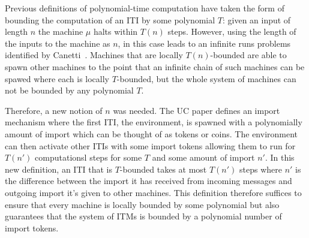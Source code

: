 Previous definitions of polynomial-time computation have taken the form of bounding the computation of an ITI by some polynomial $T$:
given an input of length $n$ the machine $\mu$ halts within $T(n)$ steps.
However, using the length of the inputs to the machine as $n$, in this case leads to an infinite runs problems identified by Canetti~\cite{uc}.
Machines that are locally $T(n)$-bounded are able to spawn other machines to the point that an infinite chain of such machines can be spawed where each is locally $T$-bounded, but the whole system of machines can not be bounded by any polynomial $T$.

Therefore, a new notion of $n$ was needed. The UC paper defines an import mechanism where the first ITI, the environment, is spawned with a polynomially amount of import which can be thought of as tokens or coins.
The environment can then activate other ITIs with some import tokens allowing them to run for $T(n')$ computationsl steps for some $T$ and some amount of import $n'$.
In this new definition, an ITI that is $T$-bounded takes at most $T(n')$ steps where $n'$ is the difference between the import it has received from incoming messages and outgoing import it's given to other machines.
This definition therefore suffices to ensure that every machine is locally bounded by some polynomial but also guarantees that the system of ITMs is bounded by a polynomial number of import tokens. 

